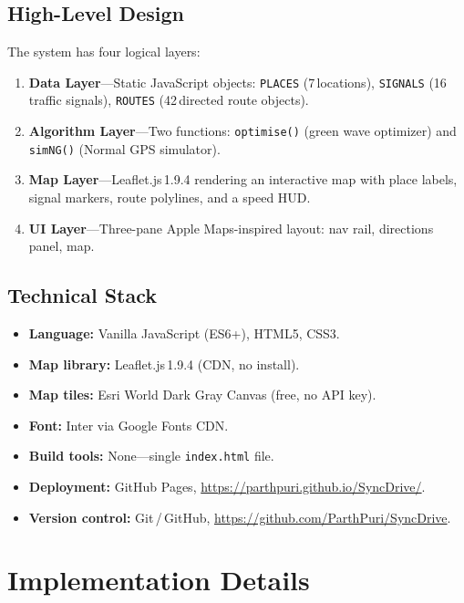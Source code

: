 \documentclass[12pt,a4paper]{report}
\begin{document}
\subsection{High-Level Design}

The system has four logical layers:

\begin{enumerate}
  \item \textbf{Data Layer}---Static JavaScript objects: \texttt{PLACES}
        (7\,locations), \texttt{SIGNALS} (16\,traffic signals),
        \texttt{ROUTES} (42\,directed route objects).
  \item \textbf{Algorithm Layer}---Two functions: \texttt{optimise()} (green
        wave optimizer) and \texttt{simNG()} (Normal GPS simulator).
  \item \textbf{Map Layer}---Leaflet.js\,1.9.4 rendering an interactive map
        with place labels, signal markers, route polylines, and a speed HUD.
  \item \textbf{UI Layer}---Three-pane Apple Maps-inspired layout: nav rail,
        directions panel, map.
\end{enumerate}

\subsection{Technical Stack}

\begin{itemize}
  \item \textbf{Language:} Vanilla JavaScript (ES6+), HTML5, CSS3.
  \item \textbf{Map library:} Leaflet.js\,1.9.4 (CDN, no install).
  \item \textbf{Map tiles:} Esri World Dark Gray Canvas (free, no API key).
  \item \textbf{Font:} Inter via Google Fonts CDN.
  \item \textbf{Build tools:} None---single \texttt{index.html} file.
  \item \textbf{Deployment:} GitHub Pages,
        \url{https://parthpuri.github.io/SyncDrive/}.
  \item \textbf{Version control:} Git\,/\,GitHub,
        \url{https://github.com/ParthPuri/SyncDrive}.
\end{itemize}

\section{Implementation Details}
\end{document}
